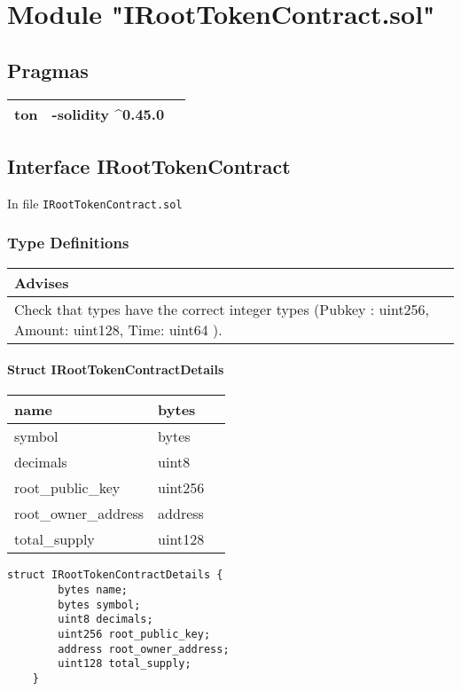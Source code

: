 
\section{Module "IRootTokenContract.sol"}


\subsection{Pragmas}


\noindent\begin{tabular}{|l|l|p{5cm}|}\hline
ton & -solidity \^{}0.45.0 &\\\hline
\end{tabular}


\subsection{Interface IRootTokenContract}


In file {\tt IRootTokenContract.sol}

\subsubsection{Type Definitions}


\ifsoldraft
\noindent\begin{tabular}{|p{12cm}|}\hline
\rowcolor{green}Advises
\\\hline
Check that types have the correct integer types (Pubkey : uint256, Amount: uint128, Time: uint64 ).
\\\hline\end{tabular}
\fi

\paragraph{Struct IRootTokenContractDetails}


\ifsoltables
\noindent\begin{tabular}{|l|l|p{6cm}|}\hline
name & bytes & \\\hline
symbol & bytes & \\\hline
decimals & uint8 & \\\hline
root\_{}public\_{}key & uint256 & \\\hline
root\_{}owner\_{}address & address & \\\hline
total\_{}supply & uint128 & \\\hline
\end{tabular}
\fi


\begin{lstlisting}[firstnumber=5]
    struct IRootTokenContractDetails {
        bytes name;
        bytes symbol;
        uint8 decimals;
        uint256 root_public_key;
        address root_owner_address;
        uint128 total_supply;
    }
\end{lstlisting}

